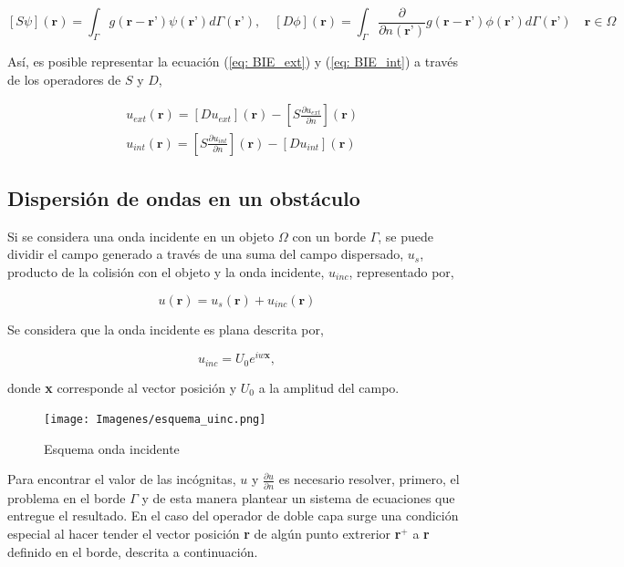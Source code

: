 \documentclass[12pt,letterpaper]{article}
\numberwithin{equation}{section}
\begin{document}
$$[S\psi](\textbf{r})=\int_{\Gamma}g(\textbf{r}-\textbf{r'})\psi(\textbf{r'}) d\varGamma(\textbf{r'}), \quad [D\phi](\textbf{r})=\int_{\Gamma}\frac{\partial}{\partial n(\textbf{r'})} g(\textbf{r}-\textbf{r'})\phi(\textbf{r'}) d\varGamma(\textbf{r'}) \quad \textbf{r}\in\Omega$$

Así, es posible representar la ecuación (\ref{eq: BIE_ext}) y (\ref{eq: BIE_int}) a través de los operadores de $S$ y $D$,

\begin{equation}
\begin{split}
	&u_{ext}(\textbf{r})=\left[D u_{ext}\right](\textbf{r}) - \left[S \frac{\partial u_{ext}}{\partial n}\right](\textbf{r})\\
	&u_{int}(\textbf{r})= \left[S \frac{\partial u_{int}}{\partial n}\right](\textbf{r}) - \left[D u_{int}\right](\textbf{r})
\end{split}
	\label{eq: BIE_potencial}
\end{equation}

\subsection{Dispersión de ondas en un obstáculo}

Si se considera una onda incidente en un objeto $\Omega$ con un borde $\Gamma$, se puede dividir el campo generado a través de una suma del campo dispersado, $u_s$, producto de la colisión con el objeto y la onda incidente, $u_{inc}$, representado por,

\begin{equation}
	u(\textbf{r})=u_s(\textbf{r})+u_{inc}(\textbf{r})
	\label{eq: separacion de onda}
\end{equation} 

Se considera que la onda incidente es plana descrita por,

$$u_{inc}=U_0 e^{iw\textbf{x}},$$

donde \textbf{x} corresponde al vector posición y $U_0$ a la amplitud del campo.

\begin{figure}[H]
	\centering\texttt{[image: Imagenes/esquema\_uinc.png]}
	\caption{Esquema onda incidente}
	\label{fig:esquema_u_inc}
\end{figure}

Para encontrar el valor de las incógnitas, $u$ y $\frac{\partial u}{\partial n}$ es necesario resolver, primero, el problema en el borde $\varGamma$ y de esta manera plantear un sistema de ecuaciones que entregue el resultado. En el caso del operador de doble capa surge una condición especial al hacer tender el vector posición \textbf{r} de algún punto extrerior \textbf{r$^+$} a \textbf{r} definido en el borde, descrita a continuación. 
\end{document}
